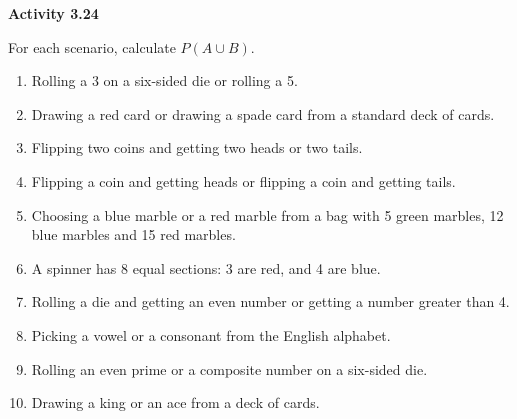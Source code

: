 \vspace{0.3ex}
\noindent\textbf{Activity 3.24}

\vspace{0.2ex}

For each scenario, calculate \( P(A \cup B) \).

\begin{enumerate}[label=\color{blue}\arabic*.]
    \item Rolling a 3 on a six-sided die or rolling a 5.
    \item Drawing a red card or drawing a spade card from a standard deck of cards.
    \item Flipping two coins and getting two heads or two tails.
    \item Flipping a coin and getting heads or flipping a coin and getting tails.
    \item Choosing a blue marble or a red marble from a bag with 5 green marbles, 12 blue marbles and 15 red marbles.
    \item A spinner has 8 equal sections: 3 are red, and 4 are blue.
    \item Rolling a die and getting an even number or getting a number greater than 4.
    \item Picking a vowel or a consonant from the English alphabet.
    \item Rolling an even prime or a composite number on a six-sided die.
    \item Drawing a king or an ace from a deck of cards.
\end{enumerate}
